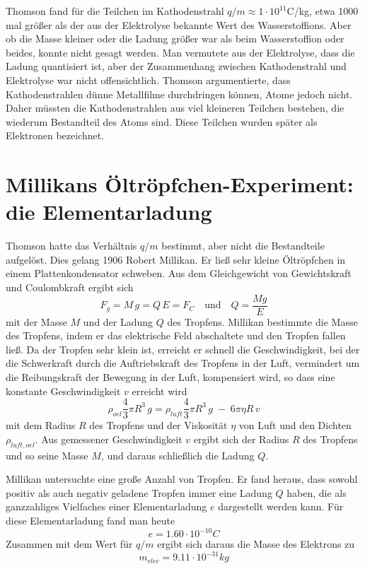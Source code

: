 Thomson fand für die Teilchen im Kathodenstrahl $q/m \approx 1 \cdot 10^{11}$C/kg, etwa 1000 mal größer als der aus der Elektrolyse bekannte Wert des Wasserstoffions. Aber ob die Masse kleiner oder die Ladung größer war als beim Wasserstoffion oder beides, konnte nicht gesagt werden. Man vermutete aus der Elektrolyse, dass die Ladung quantisiert ist, aber der Zusammenhang zwischen Kathodenstrahl und Elektrolyse war nicht offensichtlich. Thomson argumentierte, dass Kathodenstrahlen dünne Metallfilme durchdringen können, Atome jedoch nicht. Daher müssten die Kathodenstrahlen aus viel kleineren Teilchen bestehen, die wiederum Bestandteil des Atoms sind. Diese Teilchen wurden später als Elektronen bezeichnet.

\section{Millikans Öltröpfchen-Experiment: die Elementarladung}

Thomson hatte das Verhältnis $q/m$ bestimmt, aber nicht die Bestandteile aufgelöst. Dies gelang 1906 Robert Millikan. Er ließ sehr kleine Öltröpfchen in einem Plattenkondensator schweben. Aus dem Gleichgewicht von Gewichtskraft und Coulombkraft ergibt sich 
\begin{equation}
    F_g = M \, g = Q \, E = F_C \quad \text{und} \quad Q = \frac{M g}{E}
\end{equation}
mit der Masse $M$ und der Ladung $Q$ des Tropfens. Millikan bestimmte die Masse des Tropfens, indem er das elektrische Feld abschaltete und den Tropfen fallen ließ. Da der Tropfen sehr klein ist, erreicht er schnell die Geschwindigkeit, bei der die Schwerkraft durch die Auftriebskraft des Tropfens in der Luft, vermindert um die Reibungskraft der Bewegung in der Luft, kompensiert wird, so dass eine konstante Geschwindigkeit $v$ erreicht wird
\begin{equation}
    \rho_{oel} \frac{4}{3} \pi R^3 \, g  =  \rho_{luft} \frac{4}{3} \pi R^3 \, g
     \; - \; 6 
     \pi \eta R \, v 
 \end{equation}
mit dem Radius $R$ des Tropfens und der Viskosität $\eta$ von Luft und den Dichten $\rho_{luft, oel}$. Aus gemessener Geschwindigkeit $v$ ergibt sich  der Radius  $R$ des Tropfens und so seine Masse $M$, und daraus schließlich die Ladung $Q$.

Millikan untersuchte eine große Anzahl von Tropfen. Er fand heraus, dass sowohl positiv als auch negativ geladene Tropfen immer eine Ladung $Q$ haben, die als ganzzahliges Vielfaches einer Elementarladung $e$ dargestellt werden kann. Für diese Elementarladung fand man heute
\begin{equation}
    e = 1.60 \cdot 10^{-10} C  
\end{equation}
Zusammen mit dem Wert für $q/m$ ergibt sich daraus die Masse des Elektrons zu
\begin{equation}
    m_{elec} = 9.11 \cdot 10^{-31} kg  
\end{equation}


